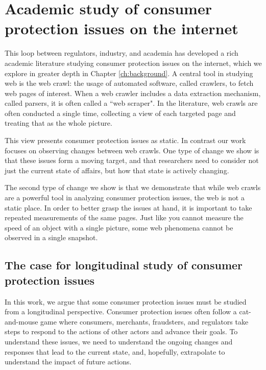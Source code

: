 



\section{Academic study of consumer protection issues on the internet}
This loop between regulators, industry, and academia has developed a rich academic literature studying consumer protection issues on the internet, which we explore in greater depth in Chapter \ref{ch:background}. A central tool in studying web is the web crawl: the usage of automated software, called crawlers, to fetch web pages of interest. When a web crawler includes a data extraction mechanism, called parsers, it is often called a ``web scraper". In the literature, web crawls are often conducted a single time, collecting a view of each targeted page and treating that as the whole picture.

This view presents consumer protection issues as static. In contrast our work focuses on observing changes between web crawls. One type of change we show is that these issues form a moving target, and that researchers need to consider not just the current state of affairs, but how that state is actively changing.

The second type of change we show is that we demonstrate that while web crawls are a powerful tool in analyzing consumer protection issues, the web is not a static place. In order to better grasp the issues at hand, it is important to take repeated measurements of the same pages. Just like you cannot measure the speed of an object with a single picture, some web phenomena cannot be observed in a single snapshot.

\subsection{The case for longitudinal study of consumer protection issues}
In this work, we argue that some consumer protection issues must be studied from a longitudinal perspective. Consumer protection issues often follow a cat-and-mouse game where consumers, merchants, fraudsters, and regulators take steps to respond to the actions of other actors and advance their goals. To understand these issues, we need to understand the ongoing changes and responses that lead to the current state, and, hopefully, extrapolate to understand the impact of future actions.

